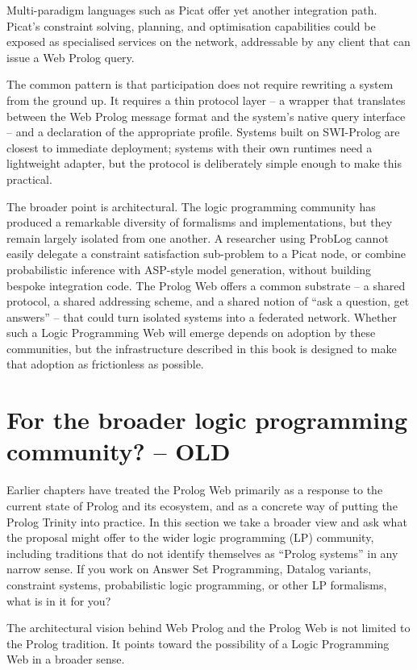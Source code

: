 Multi-paradigm languages such as Picat offer yet another integration path. Picat's constraint solving, planning, and optimisation capabilities could be exposed as specialised services on the network, addressable by any client that can issue a Web Prolog query.

The common pattern is that participation does not require rewriting a system from the ground up. It requires a thin protocol layer -- a wrapper that translates between the Web Prolog message format and the system's native query interface -- and a declaration of the appropriate profile. Systems built on SWI-Prolog are closest to immediate deployment; systems with their own runtimes need a lightweight adapter, but the protocol is deliberately simple enough to make this practical.

The broader point is architectural. The logic programming community has produced a remarkable diversity of formalisms and implementations, but they remain largely isolated from one another. A researcher using ProbLog cannot easily delegate a constraint satisfaction sub-problem to a Picat node, or combine probabilistic inference with ASP-style model generation, without building bespoke integration code. The Prolog Web offers a common substrate -- a shared protocol, a shared addressing scheme, and a shared notion of ``ask a question, get answers'' -- that could turn isolated systems into a federated network. Whether such a Logic Programming Web will emerge depends on adoption by these communities, but the infrastructure described in this book is designed to make that adoption as frictionless as possible.


\section{For the broader logic programming community? -- OLD}\label{sec:broader-LP-community}

Earlier chapters have treated the Prolog Web primarily as a response to the current state of Prolog and its ecosystem, and as a concrete way of putting the Prolog Trinity into practice. In this section we take a broader view and ask what the proposal might offer to the wider logic programming (LP) community, including traditions that do not identify themselves as ``Prolog systems'' in any narrow sense. If you work on Answer Set Programming, Datalog variants, constraint systems, probabilistic logic programming, or other LP formalisms, what is in it for you?

The architectural vision behind Web Prolog and the Prolog Web is not limited to the Prolog tradition. It points toward the possibility of a Logic Programming Web in a broader sense. 


